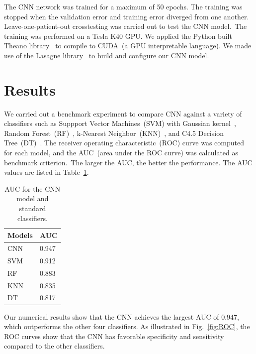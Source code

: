 \documentclass{article}
\begin{document}
The CNN network was trained for a maximum of 50 epochs. The training was stopped when the validation error and training error diverged from one another.
Leave-one-patient-out crosstesting was carried out to test the CNN model.~The training was performed on a Tesla K40 GPU. We applied the Python built Theano library~\cite{bergstra+al:2010-scipy,Bastien-Theano-2012} to compile to CUDA~(a GPU interpretable language). We made use of the Lasagne library~\cite{sander_dieleman_2015_27878} to build and configure our CNN model.

\section{Results}
\label{sec:Benchmark}

We carried out a benchmark experiment to compare CNN against a variety of classifiers such as Suppport Vector Machines~(SVM) with Gaussian kernel~\cite{hearst1998support}, Random Forest~(RF)~\cite{svetnik2003random}, k-Nearest Neighbor~(KNN)~\cite{peterson2009k}, and C4.5 Decision Tree~(DT)~\cite{quinlan1986induction}.
The receiver operating characteristic~(ROC) curve was computed for each model, and the AUC~(area under the ROC curve) was calculated as benchmark criterion.~The larger the AUC, the better the performance. The AUC values are listed in Table~\ref{tab:AUC}.

\begin{table}[htb]
    \centering

    \begin{tabular}{|l|l|}
    \hline
    Models & AUC    \\ \hline
    CNN    & 0.947 \\
    SVM    & 0.912 \\
    RF     & 0.883 \\
    KNN    & 0.835 \\
    DT     & 0.817 \\ \hline
    \end{tabular}

    \caption{AUC for the CNN model and standard classifiers.}
    \label{tab:AUC}

\end{table}

Our numerical results show that the CNN achieves the largest AUC of 0.947, which outperforms the other four classifiers. As illustrated in Fig.~\ref{fig:ROC}, the ROC curves show that the CNN has favorable specificity and sensitivity compared to the other classifiers.
\end{document}
